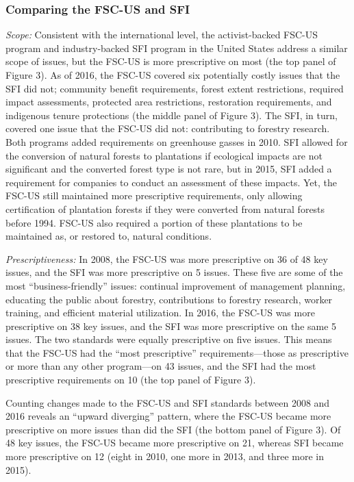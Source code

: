 \documentclass[
      12pt,
            Review ]{article}
\begin{document}
\hypertarget{comparing-the-fsc-us-and-sfi}{%
\subsubsection{Comparing the FSC-US and SFI}\label{comparing-the-fsc-us-and-sfi}}

\emph{Scope:} Consistent with the international level, the activist-backed FSC-US program and industry-backed SFI program in the United States address a similar scope of issues, but the FSC-US is more prescriptive on most (the top panel of Figure 3). As of 2016, the FSC-US covered six potentially costly issues that the SFI did not; community benefit requirements, forest extent restrictions, required impact assessments, protected area restrictions, restoration requirements, and indigenous tenure protections (the middle panel of Figure 3). The SFI, in turn, covered one issue that the FSC-US did not: contributing to forestry research. Both programs added requirements on greenhouse gasses in 2010. SFI allowed for the conversion of natural forests to plantations if ecological impacts are not significant and the converted forest type is not rare, but in 2015, SFI added a requirement for companies to conduct an assessment of these impacts. Yet, the FSC-US still maintained more prescriptive requirements, only allowing certification of plantation forests if they were converted from natural forests before 1994. FSC-US also required a portion of these plantations to be maintained as, or restored to, natural conditions.

\emph{Prescriptiveness:} In 2008, the FSC-US was more prescriptive on 36 of 48 key issues, and the SFI was more prescriptive on 5 issues. These five are some of the most ``business-friendly'' issues: continual improvement of management planning, educating the public about forestry, contributions to forestry research, worker training, and efficient material utilization. In 2016, the FSC-US was more prescriptive on 38 key issues, and the SFI was more prescriptive on the same 5 issues. The two standards were equally prescriptive on five issues. This means that the FSC-US had the ``most prescriptive'' requirements---those as prescriptive or more than any other program---on 43 issues, and the SFI had the most prescriptive requirements on 10 (the top panel of Figure 3).

Counting changes made to the FSC-US and SFI standards between 2008 and 2016 reveals an ``upward diverging'' pattern, where the FSC-US became more prescriptive on more issues than did the SFI (the bottom panel of Figure 3). Of 48 key issues, the FSC-US became more prescriptive on 21, whereas SFI became more prescriptive on 12 (eight in 2010, one more in 2013, and three more in 2015).
\end{document}
